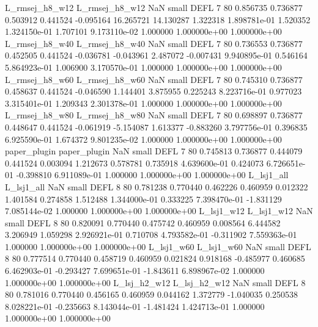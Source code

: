 L_rmsej_h8_w12 L_rmsej_h8_w12                   NaN      small     DEFL                 7 80 0.856735       0.736877 0.503912       0.441524   -0.095164     16.265721     14.130287     1.322318   1.898781e-01  1.520352 1.324150e-01     1.707101   9.173110e-02            1.000000    1.000000e+00        1.000000e+00
L_rmsej_h8_w40 L_rmsej_h8_w40                   NaN      small     DEFL                 7 80 0.736553       0.736877 0.452505       0.441524   -0.036781     -0.043961      2.487072    -0.007431   9.940895e-01  0.546164 5.864923e-01     1.006900   3.170570e-01            1.000000    1.000000e+00        1.000000e+00
L_rmsej_h8_w60 L_rmsej_h8_w60                   NaN      small     DEFL                 7 80 0.745310       0.736877 0.458637       0.441524   -0.046590      1.144401      3.875955     0.225243   8.223716e-01  0.977023 3.315401e-01     1.209343   2.301378e-01            1.000000    1.000000e+00        1.000000e+00
L_rmsej_h8_w80 L_rmsej_h8_w80                   NaN      small     DEFL                 7 80 0.698897       0.736877 0.448647       0.441524   -0.061919     -5.154087      1.613377    -0.883260   3.797756e-01  0.396835 6.925590e-01     1.674372   9.801235e-02            1.000000    1.000000e+00        1.000000e+00
  paper_plugin   paper_plugin                   NaN      small     DEFL                 7 80 0.745813       0.736877 0.444079       0.441524    0.003094      1.212673      0.578781     0.735918   4.639600e-01  0.424073 6.726651e-01    -0.398810   6.911089e-01            1.000000    1.000000e+00        1.000000e+00
    L_lsj1_all     L_lsj1_all                   NaN      small     DEFL                 8 80 0.781238       0.770440 0.462226       0.460959    0.012322      1.401584      0.274858     1.512488   1.344000e-01  0.333225 7.398470e-01    -1.831129   7.085144e-02            1.000000    1.000000e+00        1.000000e+00
    L_lsj1_w12     L_lsj1_w12                   NaN      small     DEFL                 8 80 0.820091       0.770440 0.475742       0.460959    0.008564      6.444582      3.206949     1.059298   2.926921e-01  0.710708 4.793582e-01    -0.311902   7.559363e-01            1.000000    1.000000e+00        1.000000e+00
    L_lsj1_w60     L_lsj1_w60                   NaN      small     DEFL                 8 80 0.777514       0.770440 0.458719       0.460959    0.021824      0.918168     -0.485977     0.460685   6.462903e-01 -0.293427 7.699651e-01    -1.843611   6.898967e-02            1.000000    1.000000e+00        1.000000e+00
  L_lsj_h2_w12   L_lsj_h2_w12                   NaN      small     DEFL                 8 80 0.781016       0.770440 0.456165       0.460959    0.044162      1.372779     -1.040035     0.250538   8.028221e-01 -0.235663 8.143044e-01    -1.481424   1.424713e-01            1.000000    1.000000e+00        1.000000e+00
